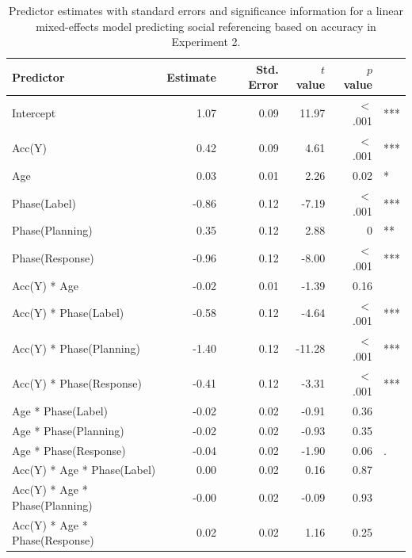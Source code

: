 \documentclass[a4paper,man,apacite,floatsintext]{apa6}
\begin{document}
\begin{table}[b]
\centering
\begin{tabular}{lrrrrl}
 Predictor & Estimate & Std. Error & $t$ value & $p$ value &  \\ 
  \hline
Intercept & 1.07 & 0.09 & 11.97 & $<$ .001 & *** \\ 
  Acc(Y) & 0.42 & 0.09 & 4.61 & $<$ .001 & *** \\ 
  Age & 0.03 & 0.01 & 2.26 & 0.02 & * \\ 
  Phase(Label) & -0.86 & 0.12 & -7.19 & $<$ .001 & *** \\ 
  Phase(Planning) & 0.35 & 0.12 & 2.88 & 0 & ** \\ 
  Phase(Response) & -0.96 & 0.12 & -8.00 & $<$ .001 & *** \\ 
  Acc(Y) * Age & -0.02 & 0.01 & -1.39 & 0.16 &  \\ 
  Acc(Y) * Phase(Label) & -0.58 & 0.12 & -4.64 & $<$ .001 & *** \\ 
  Acc(Y) * Phase(Planning) & -1.40 & 0.12 & -11.28 & $<$ .001 & *** \\ 
  Acc(Y) * Phase(Response) & -0.41 & 0.12 & -3.31 & $<$ .001 & *** \\ 
  Age * Phase(Label) & -0.02 & 0.02 & -0.91 & 0.36 &  \\ 
  Age * Phase(Planning) & -0.02 & 0.02 & -0.93 & 0.35 &  \\ 
  Age * Phase(Response) & -0.04 & 0.02 & -1.90 & 0.06 & . \\ 
  Acc(Y) * Age * Phase(Label) & 0.00 & 0.02 & 0.16 & 0.87 &  \\ 
  Acc(Y) * Age * Phase(Planning) & -0.00 & 0.02 & -0.09 & 0.93 &  \\ 
  Acc(Y) * Age * Phase(Response) & 0.02 & 0.02 & 1.16 & 0.25 &  \\ 
   \hline
\end{tabular}
\caption{Predictor estimates with standard errors and significance information for a linear mixed-effects model predicting social referencing based on accuracy in Experiment 2.} 
\label{tab:exp2acc_reg}
\end{table}
\end{document}

